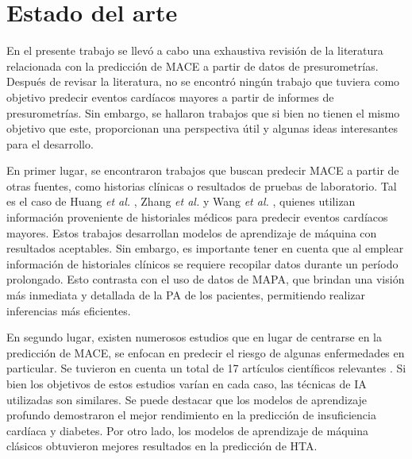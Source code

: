 
\section{Estado del arte}

En el presente trabajo se llevó a cabo una exhaustiva revisión de la literatura relacionada con la predicción 
de MACE a partir de datos de presurometrías.
Después de revisar la literatura, no se encontró ningún trabajo que tuviera como objetivo predecir eventos 
cardíacos mayores a partir de informes de presurometrías. Sin embargo, se hallaron trabajos que si bien no 
tienen el mismo objetivo que este, proporcionan una perspectiva útil y algunas ideas interesantes
 para el desarrollo.

En primer lugar, se encontraron trabajos que buscan predecir MACE a partir de otras fuentes, como historias clínicas 
o resultados de pruebas de laboratorio. Tal es el caso de Huang \emph{et al.} \citep{CITE:11}, Zhang \emph{et al.} \citep{CITE:12} y 
Wang \emph{et al.} \citep{CITE:13}, quienes utilizan información proveniente de historiales médicos para predecir eventos 
cardíacos mayores. Estos trabajos desarrollan modelos de aprendizaje de máquina con resultados aceptables. 
Sin embargo, es importante tener en cuenta que 
al emplear información de historiales clínicos se requiere recopilar datos durante un período prolongado. 
Esto contrasta con el uso de datos de MAPA, que brindan una visión más inmediata y detallada de la PA de los pacientes, 
permitiendo realizar inferencias más eficientes.

En segundo lugar, existen numerosos estudios que en lugar de centrarse en la predicción de MACE, se enfocan en 
predecir el riesgo de algunas enfermedades en particular. Se tuvieron en cuenta un total de 17 artículos científicos 
relevantes \citep{CITE:14} \citep{CITE:15} \citep{CITE:16} \citep{CITE:17} \citep{CITE:18}
\citep{CITE:19} \citep{CITE:20} \citep{CITE:21} \citep{CITE:22} \citep{CITE:23} \citep{CITE:24}
\citep{CITE:25} \citep{CITE:26} \citep{CITE:27} \citep{CITE:28} \citep{CITE:29} \citep{CITE:30} \citep{CITE:31}.  
Si bien los objetivos de estos estudios varían en cada caso, las técnicas de IA utilizadas son similares. 
Se puede destacar que los modelos de aprendizaje profundo demostraron el mejor rendimiento en la predicción de 
insuficiencia cardíaca y diabetes. Por otro lado, los modelos de aprendizaje de máquina clásicos obtuvieron 
mejores resultados en la predicción de HTA.

